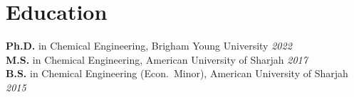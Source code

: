 \documentclass[letterpaper,12pt]{article}
\begin{document}
\section*{Education}
\textbf{Ph.D.} in Chemical Engineering, Brigham Young University \hfill \textit{2022} \\
\textbf{M.S.} in Chemical Engineering, American University of Sharjah \hfill \textit{2017} \\
\textbf{B.S.} in Chemical Engineering (Econ.~Minor), American University of Sharjah \hfill \textit{2015}

\end{document}
